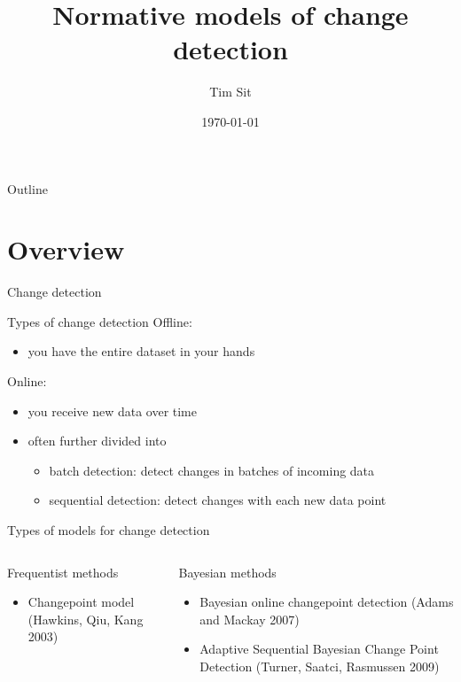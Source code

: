 \documentclass[presentation]{beamer}
\author{Tim Sit}
\date{\today}
\title{Normative models of change detection}
\begin{document}
\maketitle
\begin{frame}{Outline}
\tableofcontents
\end{frame}


\section{Overview}
\label{sec:orga96207b}

\begin{frame}[label={sec:orgec82ea3}]{Change detection}
\end{frame}

\begin{frame}[label={sec:orgbc1450f}]{Types of change detection}
Offline: 

\begin{itemize}
\item you have the entire dataset in your hands
\end{itemize}

Online: 

\begin{itemize}
\item you receive new data over time
\item often further divided into 
\begin{itemize}
\item batch detection: detect changes in batches of incoming data
\item sequential detection: detect changes with each new data point
\end{itemize}
\end{itemize}
\end{frame}

\begin{frame}[label={sec:org363ee1f}]{Types of models for change detection}
\begin{columns}
\begin{column}{0.5\columnwidth}
Frequentist methods 

\begin{itemize}
\item Changepoint model (Hawkins, Qiu, Kang 2003)
\end{itemize}
\end{column}

\begin{column}{0.5\columnwidth}
Bayesian methods

\begin{itemize}
\item Bayesian online changepoint detection (Adams and Mackay 2007)
\item Adaptive Sequential Bayesian Change Point Detection (Turner, Saatci, Rasmussen 2009)
\end{itemize}
\end{column}
\end{columns}
\end{frame}
\end{document}

